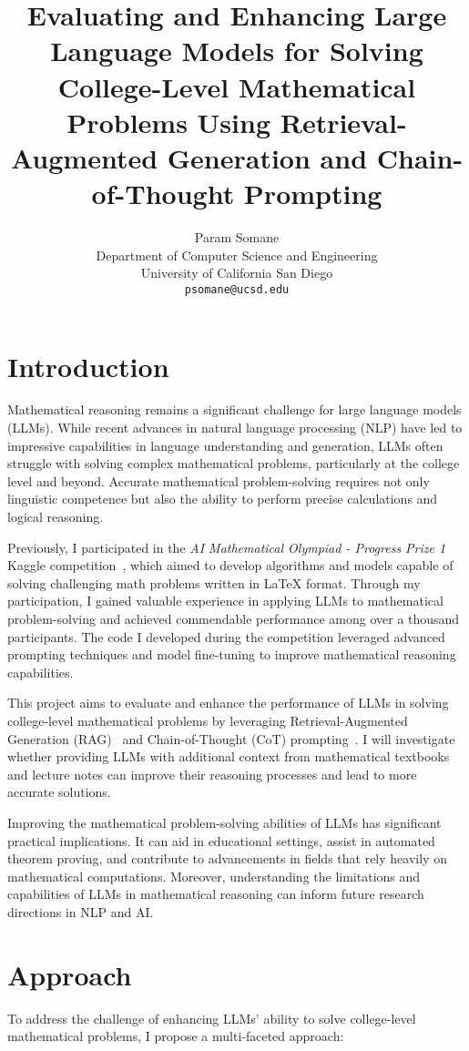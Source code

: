 \documentclass[11pt,a4paper]{article}
\title{Evaluating and Enhancing Large Language Models for Solving College-Level Mathematical Problems Using Retrieval-Augmented Generation and Chain-of-Thought Prompting}
\author{Param Somane \\
  Department of Computer Science and Engineering \\
  University of California San Diego \\
  \texttt{psomane@ucsd.edu}
  }
\date{}
\begin{document}
\maketitle

\section{Introduction}
Mathematical reasoning remains a significant challenge for large language models (LLMs). While recent advances in natural language processing (NLP) have led to impressive capabilities in language understanding and generation, LLMs often struggle with solving complex mathematical problems, particularly at the college level and beyond. Accurate mathematical problem-solving requires not only linguistic competence but also the ability to perform precise calculations and logical reasoning.

Previously, I participated in the \textit{AI Mathematical Olympiad - Progress Prize 1} Kaggle competition~\cite{aimo2024}, which aimed to develop algorithms and models capable of solving challenging math problems written in LaTeX format. Through my participation, I gained valuable experience in applying LLMs to mathematical problem-solving and achieved commendable performance among over a thousand participants. The code I developed during the competition leveraged advanced prompting techniques and model fine-tuning to improve mathematical reasoning capabilities.

This project aims to evaluate and enhance the performance of LLMs in solving college-level mathematical problems by leveraging Retrieval-Augmented Generation (RAG)~\cite{lewis2020retrieval} and Chain-of-Thought (CoT) prompting~\cite{wei2022chain}. I will investigate whether providing LLMs with additional context from mathematical textbooks and lecture notes can improve their reasoning processes and lead to more accurate solutions.

Improving the mathematical problem-solving abilities of LLMs has significant practical implications. It can aid in educational settings, assist in automated theorem proving, and contribute to advancements in fields that rely heavily on mathematical computations. Moreover, understanding the limitations and capabilities of LLMs in mathematical reasoning can inform future research directions in NLP and AI.

\section{Approach}
To address the challenge of enhancing LLMs' ability to solve college-level mathematical problems, I propose a multi-faceted approach:
\end{document}
